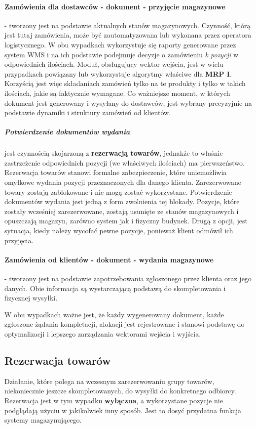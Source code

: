 		\paragraph{Zamówienia dla dostawców - dokument  - przyjęcie magazynowe} - tworzony jest na podstawie
		aktualnych stanów magazynowych. Czynność, którą jest tutaj zamówienia, może być zautomatyzowana lub wykonana
		przez operatora logistycznego. W obu wypadkach wykorzystuje się raporty generowane przez system WMS i 
		na ich podstawie podejmuje decyzje o zamówieniu \textit{k pozycji} w odpowiednich ilościach. Moduł, obsługujący
		wektor wejścia, jest w wielu przypadkach powiązany lub wykorzystuje algorytmy właściwe dla \textbf{MRP I}. 
		Korzyścią jest więc składaniach zamówień tylko na te produkty i tylko w takich ilościach, jakie są faktycznie wymagane.
		Co ważniejsze moment, w których dokument jest generowany i wysyłany do dostawców, jest wybrany precyzyjnie na
		podstawie dynamiki i struktury zamówień od klientów.
			\subparagraph{Potwierdzenie dokumentów wydania} jest czynnością skojarzoną z \textbf{rezerwacją towarów},
			jednakże to właśnie zastrzeżenie odpowiednich pozycji (we właściwych ilościach) ma pierwszeństwo. 
			Rezerwacja towarów stanowi formalne zabezpieczenie, które uniemożliwia omyłkowe wydania 
			pozycji przeznaczonych dla danego klienta. Zarezerwowane towary zostają zablokowane i nie mogą 
			zostać wykorzystane.
			Potwierdzenie dokumentów wydania jest jedną z form zwolnienia tej blokady. Pozycje, które zostały
			wcześniej zarezerwowane, zostają usunięte ze stanów magazynowych i opuszczają magazyn, zarówno
			system jak i fizyczny budynek. Drugą z opcji, jest sytuacja, kiedy należy wycofać pewne 
			pozycje, ponieważ klient odmówił ich przyjęcia.  
		\paragraph{Zamówienia od klientów -  dokument  - wydania magazynowe} - tworzony jest na podstawie zapotrzebowania
		zgłoszonego przez klienta oraz jego danych. Obie informacja są wystarczającą podstawą do skompletowania
		i fizycznej wysyłki. 
		
		W obu wypadkach ważne jest, że każdy wygenerowany dokument, każde zgłoszone żądania kompletacji, alokacji
		jest rejestrowane i stanowi podstawę do optymalizacji i lepszego zarządzania wektorami wejścia i wyjścia. 
	
	\subsection{Rezerwacja towarów}
		Działanie, które polega na wczesnym zarezerwowaniu grupy towarów, niekoniecznie jeszcze skompletowanych,
		do wysyłki do konkretnego odbiorcy. Rezerwacja jest w tym wypadku \textbf{wyłączna}, a wykorzystane
		pozycje nie podglądają użyciu w jakikolwiek inny sposób. Jest to dosyć przydatna funkcja systemy magazynującego.\\
		

